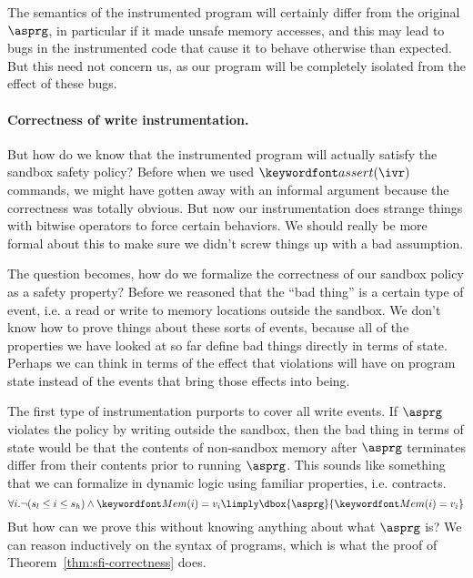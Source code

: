 \documentclass[11pt,twoside]{scrartcl}
\begin{document}
The semantics of the instrumented program will certainly differ from the original $\asprg$, in particular if it made unsafe memory accesses, and this may lead to bugs in the instrumented code that cause it to behave otherwise than expected. But this need not concern us, as our program will be completely isolated from the effect of these bugs.

\paragraph{Correctness of write instrumentation.} But how do we know that the instrumented program will actually satisfy the sandbox safety policy? Before when we used $\passert{\ivr}$ commands, we might have gotten away with an informal argument because the correctness was totally obvious. But now our instrumentation does strange things with bitwise operators to force certain behaviors. We should really be more formal about this to make sure we didn't screw things up with a bad assumption.

The question becomes, how do we formalize the correctness of our sandbox policy as a safety property? Before we reasoned that the ``bad thing'' is a certain type of event, i.e. a read or write to memory locations outside the sandbox. We don't know how to prove things about these sorts of events, because all of the properties we have looked at so far define bad things  directly in terms of state. Perhaps we can think in terms of the effect that violations will have on program state instead of the events that bring those effects into being.

The first type of instrumentation purports to cover all write events. If $\asprg$ violates the policy by writing outside the sandbox, then the bad thing in terms of state would be that the contents of non-sandbox memory after $\asprg$ terminates differ from their contents prior to running $\asprg$. This sounds like something that we can formalize in dynamic logic using familiar properties, i.e. contracts.
\begin{equation}
\label{eq:sfi-integrity}
\forall i . \lnot(s_l \le i \le s_h)  \land \pderef{i}=v_i \limply \dbox{\asprg}{\pderef{i}=v_i}
\end{equation}
But how can we prove this without knowing anything about what $\asprg$ is? We can reason inductively on the syntax of programs, which is what the proof of Theorem~\ref{thm:sfi-correctness} does.
\end{document}
